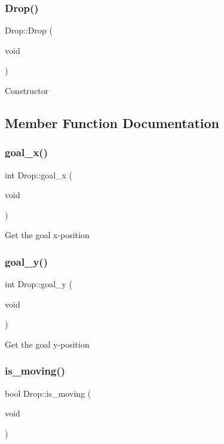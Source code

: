 \subsubsection{\texorpdfstring{Drop()}{Drop()}}
{\footnotesize\ttfamily Drop\+::\+Drop (\begin{DoxyParamCaption}\item[{void}]{ }\end{DoxyParamCaption})}

Constructor 

\subsection{Member Function Documentation}
\mbox{\label{class_drop_a2ed9f90dfadf25b9796413928477a4d9}} 
\subsubsection{\texorpdfstring{goal\+\_\+x()}{goal\_x()}}
{\footnotesize\ttfamily int Drop\+::goal\+\_\+x (\begin{DoxyParamCaption}\item[{void}]{ }\end{DoxyParamCaption})}

Get the goal x-\/position \mbox{\label{class_drop_a8dae6265dfd15a8bcc16f99384dbb7b7}} 
\subsubsection{\texorpdfstring{goal\+\_\+y()}{goal\_y()}}
{\footnotesize\ttfamily int Drop\+::goal\+\_\+y (\begin{DoxyParamCaption}\item[{void}]{ }\end{DoxyParamCaption})}

Get the goal y-\/position \mbox{\label{class_drop_afaaacdffc178e1b695ba31e2fd8c2bd9}} 
\subsubsection{\texorpdfstring{is\+\_\+moving()}{is\_moving()}}
{\footnotesize\ttfamily bool Drop\+::is\+\_\+moving (\begin{DoxyParamCaption}\item[{void}]{ }\end{DoxyParamCaption})}

